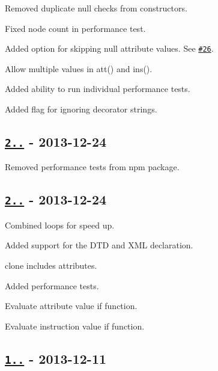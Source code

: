 \begin{DoxyItemize}
\item Removed duplicate null checks from constructors.
\item Fixed node count in performance test.
\item Added option for skipping null attribute values. See \href{https://github.com/oozcitak/xmlbuilder-js/issues/26}{\tt \#26}.
\item Allow multiple values in {\ttfamily att()} and {\ttfamily ins()}.
\item Added ability to run individual performance tests.
\item Added flag for ignoring decorator strings.
\end{DoxyItemize}

\subsection*{\href{https://github.com/oozcitak/xmlbuilder-js/compare/v2.0.0...v2.0.1}{\tt 2..} -\/ 2013-\/12-\/24}


\begin{DoxyItemize}
\item Removed performance tests from npm package.
\end{DoxyItemize}

\subsection*{\href{https://github.com/oozcitak/xmlbuilder-js/compare/v1.1.2...v2.0.0}{\tt 2..} -\/ 2013-\/12-\/24}


\begin{DoxyItemize}
\item Combined loops for speed up.
\item Added support for the D\+TD and X\+ML declaration.
\item {\ttfamily clone} includes attributes.
\item Added performance tests.
\item Evaluate attribute value if function.
\item Evaluate instruction value if function.
\end{DoxyItemize}

\subsection*{\href{https://github.com/oozcitak/xmlbuilder-js/compare/v1.1.1...v1.1.2}{\tt 1..} -\/ 2013-\/12-\/11}


